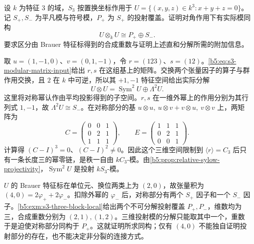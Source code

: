 \begin{optionalexercise}\label{b5:ex:08-s3-characteristic-three}
	设 \(k\) 为特征 \(3\) 的域，\(S_3\) 按置换坐标作用于 \(U=\{(x,y,z)\in k^3:x+y+z=0\}\)。记 \(S_+,S_-\) 为平凡模与符号模，\(P_+\) 为 \(S_+\) 的投射覆盖。证明对角作用下有实际模同构
	\[
		U\otimes_kU\cong P_+\oplus S_-.
	\]
	要求区分由 Brauer 特征标得到的合成重数与证明上述直和分解所需的附加信息。
\end{optionalexercise}
\begin{solution}
	取 \(u=(1,-1,0)\)、\(v=(0,1,-1)\)，令 \(r=(123)\)、\(s=(12)\)。\eqref{b5:eq:s3-modular-matrix-input}给出 \(r,s\) 在这组基上的矩阵。交换两个张量因子的算子与群作用交换，且 \(2\) 在 \(k\) 中可逆，所以其 \(+1,-1\) 特征空间给出实际分解
	\[
		U\otimes U=\operatorname{Sym}^2U\oplus\Lambda^2U.
	\]
	这里将对称幂认作由平均投影得到的子空间。\(r,s\) 在一维外幂上的作用分别为其行列式 \(1,-1\)，故 \(\Lambda^2U\cong S_-\)。在对称部分的基 \(u\otimes u,\ u\otimes v+v\otimes u,\ v\otimes v\) 上，两矩阵为
	\[
		C=\begin{pmatrix}0&0&1\\0&2&1\\1&1&1\end{pmatrix},\qquad
		E=\begin{pmatrix}1&1&1\\0&2&1\\0&0&1\end{pmatrix}.
	\]
	计算得 \((C-I)^3=0\)、\((C-I)^2\ne0\)。因此这个三维空间限制到 \(\langle r\rangle=C_3\) 后只有一条长度三的幂零链，是秩一自由 \(kC_3\)-模。由\cref{b5:prop:relative-sylow-projectivity}，\(\operatorname{Sym}^2U\) 是投射 \(kS_3\)-模。

	\(U\) 的 Brauer 特征标在单位元、换位两类上为 \((2,0)\)，故张量积为 \((4,0)=2\varphi_++2\varphi_-\)。扣除外幂的 \(\varphi_-\) 后，对称部分有两个 \(S_+\) 因子和一个 \(S_-\) 因子。\cref{b5:exm:s3-three-block-local}给出两个不可分解投射覆盖 \(P_+,P_-\)，维数均为三，合成重数分别为 \((2,1),(1,2)\)。三维投射模的分解只能取其中一个，重数于是迫使对称部分同构于 \(P_+\)。这就证明所求同构；仅有 \((4,0)\) 不能独自证明投射部分的存在，也不能决定非分裂的连接方式。
\end{solution}

